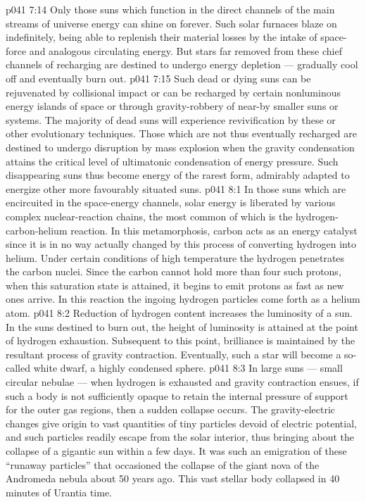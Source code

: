 \vs p041 7:14 \pc Only those suns which function in the direct channels of the main streams of universe energy can shine on forever. Such solar furnaces blaze on indefinitely, being able to replenish their material losses by the intake of space\hyp{}force and analogous circulating energy. But stars far removed from these chief channels of recharging are destined to undergo energy depletion --- gradually cool off and eventually burn out.
\vs p041 7:15 Such dead or dying suns can be rejuvenated by collisional impact or can be recharged by certain nonluminous energy islands of space or through gravity\hyp{}robbery of near\hyp{}by smaller suns or systems. The majority of dead suns will experience revivification by these or other evolutionary techniques. Those which are not thus eventually recharged are destined to undergo disruption by mass explosion when the gravity condensation attains the critical level of ultimatonic condensation of energy pressure. Such disappearing suns thus become energy of the rarest form, admirably adapted to energize other more favourably situated suns.
\vs p041 8:1 In those suns which are encircuited in the space\hyp{}energy channels, solar energy is liberated by various complex nuclear\hyp{}reaction chains, the most common of which is the hydrogen\hyp{}carbon\hyp{}helium reaction. In this metamorphosis, carbon acts as an energy catalyst since it is in no way actually changed by this process of converting hydrogen into helium. Under certain conditions of high temperature the hydrogen penetrates the carbon nuclei. Since the carbon cannot hold more than four such protons, when this saturation state is attained, it begins to emit protons as fast as new ones arrive. In this reaction the ingoing hydrogen particles come forth as a helium atom.
\vs p041 8:2 \pc Reduction of hydrogen content increases the luminosity of a sun. In the suns destined to burn out, the height of luminosity is attained at the point of hydrogen exhaustion. Subsequent to this point, brilliance is maintained by the resultant process of gravity contraction. Eventually, such a star will become a so\hyp{}called white dwarf, a highly condensed sphere.
\vs p041 8:3 \pc In large suns --- small circular nebulae --- when hydrogen is exhausted and gravity contraction ensues, if such a body is not sufficiently opaque to retain the internal pressure of support for the outer gas regions, then a sudden collapse occurs. The gravity\hyp{}electric changes give origin to vast quantities of tiny particles devoid of electric potential, and such particles readily escape from the solar interior, thus bringing about the collapse of a gigantic sun within a few days. It was such an emigration of these “runaway particles” that occasioned the collapse of the giant nova of the Andromeda nebula about 50 years ago. This vast stellar body collapsed in 40 minutes of Urantia time.
